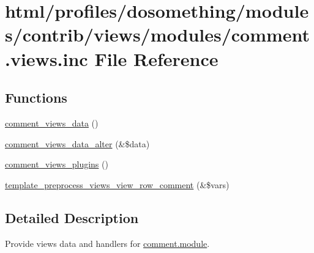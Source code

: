 \hypertarget{comment_8views_8inc}{
\section{html/profiles/dosomething/modules/contrib/views/modules/comment.views.inc File Reference}
\label{comment_8views_8inc}
}
\subsection*{Functions}
\begin{DoxyCompactItemize}
\item 
\hyperlink{comment_8views_8inc_a36dff975ac53893da10163d2ee59d652}{comment\_\-views\_\-data} ()
\item 
\hyperlink{comment_8views_8inc_af68bf474455d07d3fc30c9f61b830f30}{comment\_\-views\_\-data\_\-alter} (\&\$data)
\item 
\hyperlink{comment_8views_8inc_a20b0377d6793f1f1e1b70bcae9dd067b}{comment\_\-views\_\-plugins} ()
\item 
\hyperlink{comment_8views_8inc_ac5f17442ee6b1364544217dc2515f0ef}{template\_\-preprocess\_\-views\_\-view\_\-row\_\-comment} (\&\$vars)
\end{DoxyCompactItemize}


\subsection{Detailed Description}
Provide views data and handlers for \hyperlink{comment_8module}{comment.module}. 

